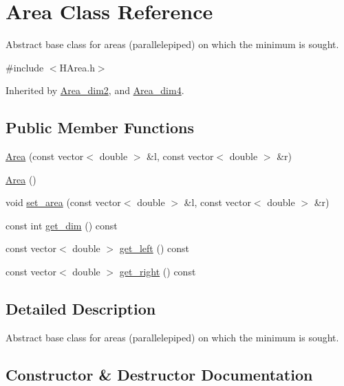 \hypertarget{class_area}{}\section{Area Class Reference}
\label{class_area}


Abstract base class for areas (parallelepiped) on which the minimum is sought.  




{\ttfamily \#include $<$H\+Area.\+h$>$}



Inherited by \hyperlink{class_area__dim2}{Area\+\_\+dim2}, and \hyperlink{class_area__dim4}{Area\+\_\+dim4}.

\subsection*{Public Member Functions}
\begin{DoxyCompactItemize}
\item 
\hyperlink{class_area_ab59b0c1700cfeedcc20e59f70a6a3ee8}{Area} (const vector$<$ double $>$ \&l, const vector$<$ double $>$ \&r)
\item 
\hyperlink{class_area_aa92851fcffb0a9f1c6c8c283204f7003}{Area} ()
\item 
void \hyperlink{class_area_a0ba2b25e1d74f7e64d433f0c8318d497}{set\+\_\+area} (const vector$<$ double $>$ \&l, const vector$<$ double $>$ \&r)
\item 
const int \hyperlink{class_area_a1b288955abef67d9598b7321e8219ae8}{get\+\_\+dim} () const
\item 
const vector$<$ double $>$ \hyperlink{class_area_af693a7f72a81522c495e5eef4296b6a9}{get\+\_\+left} () const
\item 
const vector$<$ double $>$ \hyperlink{class_area_a4bdaf9dc0d21b0798d068e759c77a134}{get\+\_\+right} () const
\end{DoxyCompactItemize}


\subsection{Detailed Description}
Abstract base class for areas (parallelepiped) on which the minimum is sought. 

\subsection{Constructor \& Destructor Documentation}
\mbox{\label{class_area_ab59b0c1700cfeedcc20e59f70a6a3ee8}} 
